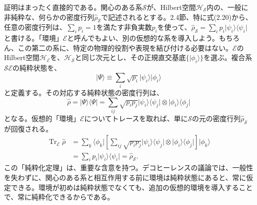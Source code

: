 証明はまったく直接的である。関心のある系$\mathcal S$が、Hilbert空間$\mathcal H_{\mathcal S}$内の、一般に非純粋な、何らかの密度行列$\hat\rho_{\mathcal S}$で記述されるとする。2.4節、特に式(2.20)から、任意の密度行列は、$\sum_i p_i=1$を満たす非負実数$p_i$を使って、$\hat\rho_{\mathcal S}=\sum_i p_i\lvert\psi_i\rangle\langle\psi_i\rvert$と書ける。「環境」$\mathcal E$と呼んでもよい、別の仮想的な系を導入しよう。もちろん、この第二の系に、特定の物理的役割や表現を結び付ける必要はない。$\mathcal E$のHilbert空間$\mathcal H_{\mathcal E}$を、$\mathcal H_{\mathcal S}$と同じ次元とし、その正規直交基底$\{\lvert\phi_i\rangle\}$を選ぶ。複合系$\mathcal{SE}$の純粋状態を、
\begin{equation}\lvert\Psi\rangle\equiv\sum_i\sqrt{p_i}\lvert\psi_i\rangle\lvert\phi_i\rangle\tag{2.136}\end{equation}
と定義する。その対応する純粋状態の密度行列は、
\begin{equation}\hat\rho=\lvert\Psi\rangle\langle\Psi\rvert=\sum_{ij}\sqrt{p_ip_j}\lvert\psi_i\rangle\langle\psi_j\rvert\otimes\lvert\phi_i\rangle\langle\phi_j\rvert\tag{2.137}\end{equation}
となる。仮想的「環境」$\mathcal E$についてトレースを取れば、単に$\mathcal S$の元の密度行列$\hat\rho_{\mathcal S}$が回復される。
\begin{align}
\operatorname{Tr}_{\mathcal E}\hat\rho&=\sum_k\langle\phi_k\rvert\left[\sum_{ij}\sqrt{p_ip_j}\lvert\psi_i\rangle\langle\psi_j\rvert\otimes\lvert\phi_i\rangle\langle\phi_j\rvert\right]\lvert\phi_k\rangle\tag{2.138}\\
&=\sum_i p_i\lvert\psi_i\rangle\langle\psi_i\rvert=\hat\rho_{\mathcal S}.\tag{2.139}
\end{align}
この「純粋化定理」は、重要な含意を持つ。デコヒーレンスの議論では、一般性を失わずに、関心のある系と相互作用する前に環境は純粋状態にあると、常に仮定できる。環境が初めは純粋状態でなくても、追加の仮想的環境を導入することで、常に純粋化できるからである。
